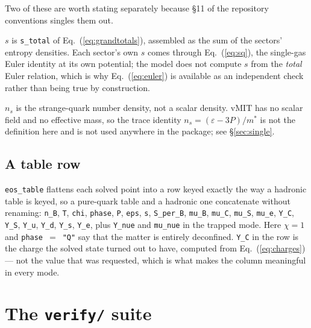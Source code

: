 \documentclass[aps,prc,onecolumn,superscriptaddress,nofootinbib,10pt]{revtex4-2}
\begin{document}
Two of these are worth stating separately because \S11 of the repository
conventions singles them out.

\textbf{$s$} is \texttt{s\_total} of Eq.~(\ref{eq:grandtotals}), assembled as
the sum of the sectors' entropy densities. Each sector's own $s$ comes through
Eq.~(\ref{eq:sq}), the single-gas Euler identity at its own potential; the
model does not compute $s$ from the \emph{total} Euler relation, which is why
Eq.~(\ref{eq:euler}) is available as an independent check rather than being
true by construction.

\textbf{$n_s$} is the strange-quark number density, not a scalar density.
vMIT has no scalar field and no effective mass, so the trace identity
$n_s = (\varepsilon - 3P)/m^*$ is not the definition here and is not used
anywhere in the package; see \S\ref{sec:single}.

\subsection{A table row}

\texttt{eos\_table} flattens each solved point into a row keyed exactly the
way a hadronic table is keyed, so a pure-quark table and a hadronic one
concatenate without renaming: \texttt{n\_B}, \texttt{T}, \texttt{chi},
\texttt{phase}, \texttt{P}, \texttt{eps}, \texttt{s}, \texttt{S\_per\_B},
\texttt{mu\_B}, \texttt{mu\_C}, \texttt{mu\_S}, \texttt{mu\_e},
\texttt{Y\_C}, \texttt{Y\_S}, \texttt{Y\_u}, \texttt{Y\_d}, \texttt{Y\_s},
\texttt{Y\_e}, plus \texttt{Y\_nue} and \texttt{mu\_nue} in the trapped mode.
Here $\chi = 1$ and \texttt{phase}~$= $~\texttt{"Q"} say that the matter is
entirely deconfined. \texttt{Y\_C} in the row is the charge the solved state
turned out to have, computed from Eq.~(\ref{eq:charges}) --- not the value
that was requested, which is what makes the column meaningful in every mode.

\section{The \texttt{verify/} suite}
\label{sec:verify}
\end{document}
